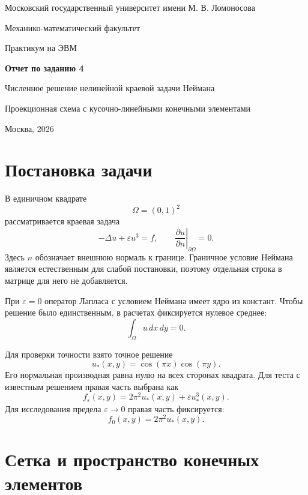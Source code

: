 \documentclass[12pt,a4paper]{article}
\newcommand{\eps}{\varepsilon}
\newcommand{\Om}{\Omega}
\newcommand{\dd}{\,dx\,dy}
\begin{document}
\begin{titlepage}
\begin{center}
{\large Московский государственный университет имени М. В. Ломоносова\par}
{\large Механико-математический факультет\par}
\vspace{1.0cm}
{\large Практикум на ЭВМ\par}
\vspace{3.0cm}
{\LARGE\bfseries Отчет по заданию 4\par}
\vspace{0.4cm}
{\Large Численное решение нелинейной краевой задачи Неймана\par}
\vspace{0.8cm}
{\large Проекционная схема с кусочно-линейными конечными элементами\par}
\vfill
Москва, 2026
\end{center}
\end{titlepage}

\tableofcontents
\newpage

\section{Постановка задачи}

В единичном квадрате
\[
  \Om=(0,1)^2
\]
рассматривается краевая задача
\[
  -\Delta u+\eps u^3=f,\qquad
  \left.\frac{\partial u}{\partial n}\right|_{\partial\Om}=0.
\]
Здесь \(n\) обозначает внешнюю нормаль к границе. Граничное условие Неймана является естественным для слабой постановки, поэтому отдельная строка в матрице для него не добавляется.

При \(\eps=0\) оператор Лапласа с условием Неймана имеет ядро из констант. Чтобы решение было единственным, в расчетах фиксируется нулевое среднее:
\[
  \int_{\Om} u\dd=0.
\]

Для проверки точности взято точное решение
\[
  u_*(x,y)=\cos(\pi x)\cos(\pi y).
\]
Его нормальная производная равна нулю на всех сторонах квадрата. Для теста с известным решением правая часть выбрана как
\[
  f_{\eps}(x,y)=2\pi^2u_*(x,y)+\eps u_*^3(x,y).
\]
Для исследования предела \(\eps\to0\) правая часть фиксируется:
\[
  f_0(x,y)=2\pi^2u_*(x,y).
\]

\section{Сетка и пространство конечных элементов}
\end{document}

